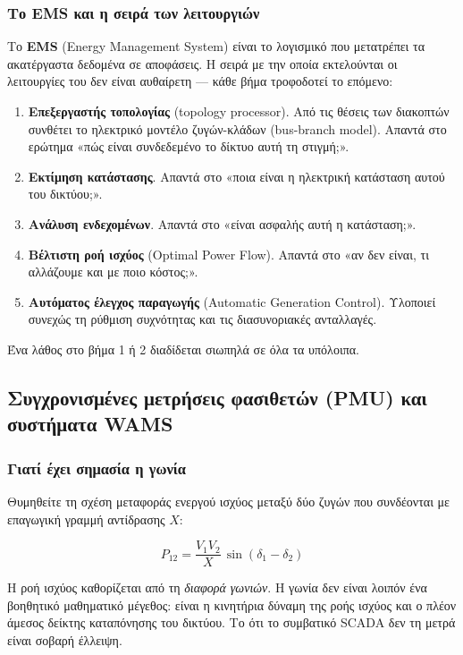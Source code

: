 \subsubsection*{Το EMS και η σειρά των λειτουργιών}

Το \textbf{EMS} (Energy Management System) είναι το λογισμικό που μετατρέπει τα ακατέργαστα
δεδομένα σε αποφάσεις. Η σειρά με την οποία εκτελούνται οι λειτουργίες του δεν είναι
αυθαίρετη — κάθε βήμα τροφοδοτεί το επόμενο:

\begin{enumerate}
\item \textbf{Επεξεργαστής τοπολογίας} (topology processor). Από τις θέσεις των διακοπτών
      συνθέτει το ηλεκτρικό μοντέλο ζυγών-κλάδων (bus-branch model). Απαντά στο ερώτημα
      «πώς είναι συνδεδεμένο το δίκτυο αυτή τη στιγμή;».
\item \textbf{Εκτίμηση κατάστασης}. Απαντά στο «ποια είναι η ηλεκτρική κατάσταση αυτού του
      δικτύου;».
\item \textbf{Ανάλυση ενδεχομένων}. Απαντά στο «είναι ασφαλής αυτή η κατάσταση;».
\item \textbf{Βέλτιστη ροή ισχύος} (Optimal Power Flow). Απαντά στο «αν δεν είναι, τι
      αλλάζουμε και με ποιο κόστος;».
\item \textbf{Αυτόματος έλεγχος παραγωγής} (Automatic Generation Control). Υλοποιεί συνεχώς
      τη ρύθμιση συχνότητας και τις διασυνοριακές ανταλλαγές.
\end{enumerate}

Ένα λάθος στο βήμα 1 ή 2 διαδίδεται σιωπηλά σε όλα τα υπόλοιπα.

\subsection{Συγχρονισμένες μετρήσεις φασιθετών (PMU) και συστήματα WAMS}

\subsubsection*{Γιατί έχει σημασία η γωνία}

Θυμηθείτε τη σχέση μεταφοράς ενεργού ισχύος μεταξύ δύο ζυγών που συνδέονται με
επαγωγική γραμμή αντίδρασης $X$:

\begin{equation}
P_{12} = \frac{V_1 V_2}{X}\,\sin(\delta_1 - \delta_2)
\label{eq:powerflow}
\end{equation}

Η ροή ισχύος καθορίζεται από τη \emph{διαφορά γωνιών}. Η γωνία δεν είναι λοιπόν ένα
βοηθητικό μαθηματικό μέγεθος: είναι η κινητήρια δύναμη της ροής ισχύος και ο πλέον άμεσος
δείκτης καταπόνησης του δικτύου. Το ότι το συμβατικό SCADA δεν τη μετρά είναι σοβαρή
έλλειψη.

